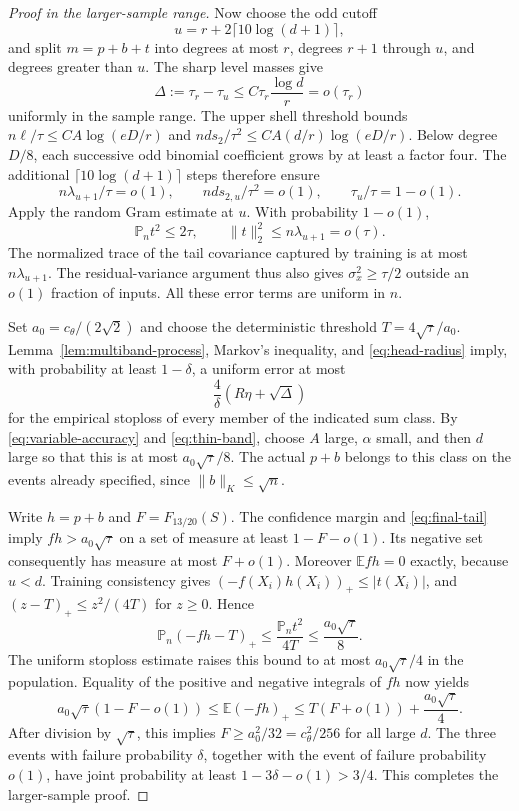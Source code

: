 \begin{proof}[Proof in the larger-sample range]
Now choose the odd cutoff
\[
 u=r+2\lceil10\log(d+1)\rceil,
\]
and split $m=p+b+t$ into degrees at most $r$, degrees $r+1$ through
$u$, and degrees greater than $u$. The sharp level masses give
\begin{equation}\label{eq:thin-band}
 \Delta:=\tau_r-\tau_u\le C\tau_r\frac{\log d}{r}=o(\tau_r)
\end{equation}
uniformly in the sample range. The upper shell threshold bounds
$n\ell/\tau\le CA\log(eD/r)$ and
$nd s_2/\tau^2\le CA(d/r)\log(eD/r)$.
Below degree $D/8$, each successive odd binomial coefficient grows by
at least a factor four. The additional $\lceil10\log(d+1)\rceil$
steps therefore ensure
\[
 n\lambda_{u+1}/\tau=o(1),\qquad
 nd s_{2,u}/\tau^2=o(1),\qquad \tau_u/\tau=1-o(1).
\]
Apply the random Gram estimate at $u$. With probability $1-o(1)$,
\begin{equation}\label{eq:final-tail}
 \mathbb P_n t^2\le2\tau,\qquad
 \|t\|_2^2\le n\lambda_{u+1}=o(\tau).
\end{equation}
The normalized trace of the tail covariance captured by training is
at most $n\lambda_{u+1}$. The residual-variance argument thus also
gives $\sigma_x^2\ge\tau/2$ outside an $o(1)$ fraction of inputs.
All these error terms are uniform in $n$.

Set $a_0=c_\theta/(2\sqrt2)$ and choose the deterministic threshold
$T=4\sqrt\tau/a_0$. Lemma~\ref{lem:multiband-process}, Markov's
inequality, and \eqref{eq:head-radius} imply, with probability at
least $1-\delta$, a uniform error at most
\[
 \frac4\delta(R\eta+\sqrt\Delta)
\]
for the empirical stoploss of every member of the indicated sum class.
By \eqref{eq:variable-accuracy} and \eqref{eq:thin-band}, choose $A$
large, $\alpha$ small, and then $d$ large so that this is at most
$a_0\sqrt\tau/8$. The actual $p+b$ belongs to this class on the
events already specified, since $\|b\|_K\le\sqrt n$.

Write $h=p+b$ and $F=F_{13/20}(S)$. The confidence margin and
\eqref{eq:final-tail} imply
$fh>a_0\sqrt\tau$ on a set of measure at least $1-F-o(1)$.
Its negative set consequently has measure at most $F+o(1)$.
Moreover $\mathbb E fh=0$ exactly, because $u<d$.
Training consistency gives $(-f(X_i)h(X_i))_+\le|t(X_i)|$, and
$(z-T)_+\le z^2/(4T)$ for $z\ge0$. Hence
\[
 \mathbb P_n(-fh-T)_+\le\frac{\mathbb P_nt^2}{4T}
             \le\frac{a_0\sqrt\tau}{8}.
\]
The uniform stoploss estimate raises this bound to at most
$a_0\sqrt\tau/4$ in the population. Equality of the positive and
negative integrals of $fh$ now yields
\[
 a_0\sqrt\tau(1-F-o(1))
 \le\mathbb E(-fh)_+
 \le T(F+o(1))+\frac{a_0\sqrt\tau}{4}.
\]
After division by $\sqrt\tau$, this implies
$F\ge a_0^2/32=c_\theta^2/256$ for all large $d$.
The three events with failure probability $\delta$, together with
the event of failure probability $o(1)$, have joint probability
at least $1-3\delta-o(1)>3/4$. This completes the larger-sample proof.
\end{proof}

